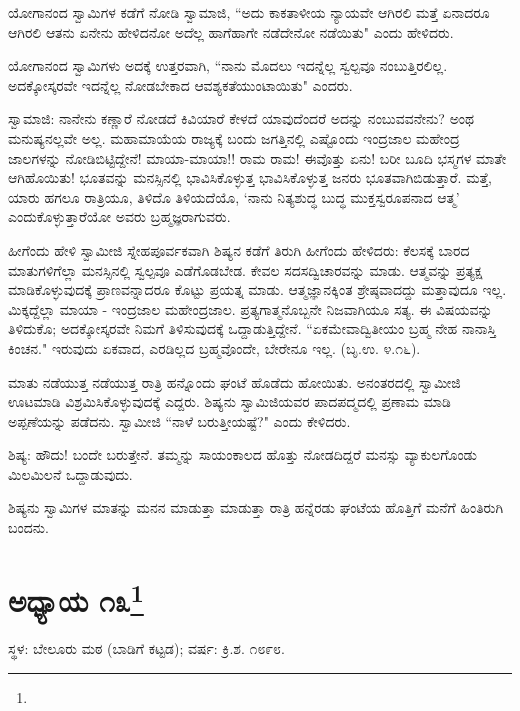 ಯೋಗಾನಂದ ಸ್ವಾಮಿಗಳ ಕಡೆಗೆ ನೋಡಿ ಸ್ವಾಮಾಜಿ, “ಅದು ಕಾಕತಾಳೀಯ ನ್ಯಾಯವೇ ಆಗಿರಲಿ ಮತ್ತೆ ಏನಾದರೂ ಆಗಿರಲಿ ಆತನು ಏನೇನು ಹೇಳಿದನೋ ಅದೆಲ್ಲ ಹಾಗೆಹಾಗೇ ನಡೆದೇನೋ ನಡೆಯಿತು" ಎಂದು ಹೇಳಿದರು.

ಯೋಗಾನಂದ ಸ್ವಾಮಿಗಳು ಅದಕ್ಕೆ ಉತ್ತರವಾಗಿ, “ನಾನು ಮೊದಲು ಇದನ್ನೆಲ್ಲ ಸ್ವಲ್ಪವೂ ನಂಬುತ್ತಿರಲಿಲ್ಲ. ಅದಕ್ಕೋಸ್ಕರವೇ ಇದನ್ನೆಲ್ಲ ನೋಡಬೇಕಾದ ಆವಶ್ಯಕತೆಯುಂಟಾಯಿತು" ಎಂದರು.

ಸ್ವಾಮಾಜಿ: ನಾನೇನು ಕಣ್ಣಾರೆ ನೋಡದೆ ಕಿವಿಯಾರೆ ಕೇಳದೆ ಯಾವುದೆಂದರೆ ಅದನ್ನು ನಂಬುವವನೇನು? ಅಂಥ ಮನುಷ್ಯನಲ್ಲವೇ ಅಲ್ಲ. ಮಹಾಮಾಯೆಯ ರಾಜ್ಯಕ್ಕೆ ಬಂದು ಜಗತ್ತಿನಲ್ಲಿ ಎಷ್ಟೊಂದು ಇಂದ್ರಜಾಲ ಮಹೇಂದ್ರ ಜಾಲಗಳನ್ನು ನೋಡಿಬಿಟ್ಟಿದ್ದೇನೆ! ಮಾಯಾ-ಮಾಯಾ!! ರಾಮ ರಾಮ! ಈವೊತ್ತು ಏನು! ಬರೀ ಬೂದಿ ಭಸ್ಮಗಳ ಮಾತೇ ಆಗಿಹೊಯಿತು! ಭೂತವನ್ನು ಮನಸ್ಸಿನಲ್ಲಿ ಭಾವಿಸಿಕೊಳ್ಳುತ್ತ ಭಾವಿಸಿಕೊಳ್ಳುತ್ತ ಜನರು ಭೂತವಾಗಿಬಿಡುತ್ತಾರೆ. ಮತ್ತೆ, ಯಾರು ಹಗಲೂ ರಾತ್ರಿಯೂ, ತಿಳಿದೊ ತಿಳಿಯದೆಯೊ, ‘ನಾನು ನಿತ್ಯಶುದ್ಧ ಬುದ್ಧ ಮುಕ್ತಸ್ವರೂಪನಾದ ಆತ್ಮ’ ಎಂದುಕೊಳ್ಳುತ್ತಾರೆಯೋ ಅವರು ಬ್ರಹ್ಮಜ್ಞರಾಗುವರು.

ಹೀಗೆಂದು ಹೇಳಿ ಸ್ವಾಮೀಜಿ ಸ್ನೇಹಪೂರ್ವಕವಾಗಿ ಶಿಷ್ಯನ ಕಡೆಗೆ ತಿರುಗಿ ಹೀಗೆಂದು ಹೇಳಿದರು: ಕೆಲಸಕ್ಕೆ ಬಾರದ ಮಾತುಗಳಿಗೆಲ್ಲಾ ಮನಸ್ಸಿನಲ್ಲಿ ಸ್ವಲ್ಪವೂ ಎಡೆಗೊಡಬೇಡ. ಕೇವಲ ಸದಸದ್ವಿಚಾರವನ್ನು ಮಾಡು. ಆತ್ಮವನ್ನು ಪ್ರತ್ಯಕ್ಷ ಮಾಡಿಕೊಳ್ಳುವುದಕ್ಕೆ ಪ್ರಾಣವನ್ನಾದರೂ ಕೊಟ್ಟು ಪ್ರಯತ್ನ ಮಾಡು. ಆತ್ಮಜ್ಞಾನಕ್ಕಿಂತ ಶ್ರೇಷ್ಠವಾದದ್ದು ಮತ್ತಾವುದೂ ಇಲ್ಲ. ಮಿಕ್ಕದ್ದೆಲ್ಲಾ ಮಾಯಾ - ಇಂದ್ರಜಾಲ ಮಹೇಂದ್ರಜಾಲ. ಪ್ರತ್ಯಗಾತ್ಮನೊಬ್ಬನೇ ನಿಜವಾಗಿಯೂ ಸತ್ಯ. ಈ ವಿಷಯವನ್ನು ತಿಳಿದುಕೊ; ಅದಕ್ಕೋಸ್ಕರವೇ ನಿಮಗೆ ತಿಳಿಸುವುದಕ್ಕೆ ಒದ್ದಾಡುತ್ತಿದ್ದೇನೆ. “ಏಕಮೇವಾದ್ವಿತೀಯಂ ಬ್ರಹ್ಮ ನೇಹ ನಾನಾಸ್ತಿ ಕಿಂಚನ." ಇರುವುದು ಏಕವಾದ, ಎರಡಿಲ್ಲದ ಬ್ರಹ್ಮವೊಂದೇ, ಬೇರೇನೂ ಇಲ್ಲ. (ಬೃ.ಉ. ೪.೧೬).

ಮಾತು ನಡೆಯುತ್ತ ನಡೆಯುತ್ತ ರಾತ್ರಿ ಹನ್ನೊಂದು ಘಂಟೆ ಹೊಡೆದು ಹೋಯಿತು. ಅನಂತರದಲ್ಲಿ ಸ್ವಾಮೀಜಿ ಊಟಮಾಡಿ ವಿಶ್ರಮಿಸಿಕೊಳ್ಳುವುದಕ್ಕೆ ಎದ್ದರು. ಶಿಷ್ಯನು ಸ್ವಾಮಿಜಿಯವರ ಪಾದಪದ್ಮದಲ್ಲಿ ಪ್ರಣಾಮ ಮಾಡಿ ಅಪ್ಪಣೆಯನ್ನು ಪಡೆದನು. ಸ್ವಾಮೀಜಿ “ನಾಳೆ ಬರುತ್ತೀಯಷ್ಟೆ?" ಎಂದು ಕೇಳಿದರು.

ಶಿಷ್ಯ: ಹೌದು! ಬಂದೇ ಬರುತ್ತೇನೆ. ತಮ್ಮನ್ನು ಸಾಯಂಕಾಲದ ಹೊತ್ತು ನೋಡದಿದ್ದರೆ ಮನಸ್ಸು ವ್ಯಾಕುಲಗೊಂಡು ಮಿಲಮಿಲನೆ ಒದ್ದಾಡುವುದು.

ಶಿಷ್ಯನು ಸ್ವಾಮಿಗಳ ಮಾತನ್ನು ಮನನ ಮಾಡುತ್ತಾ ಮಾಡುತ್ತಾ ರಾತ್ರಿ ಹನ್ನೆರಡು ಘಂಟೆಯ ಹೊತ್ತಿಗೆ ಮನೆಗೆ ಹಿಂತಿರುಗಿ ಬಂದನು.

\newpage

\chapter[ಅಧ್ಯಾಯ ೧೩]{ಅಧ್ಯಾಯ ೧೩\protect\footnote{}}

\begin{center}
ಸ್ಥಳ: ಬೇಲೂರು ಮಠ (ಬಾಡಿಗೆ ಕಟ್ಟಡ); ವರ್ಷ: ಕ್ರಿ.ಶ. ೧೮೯೮.
\end{center}

